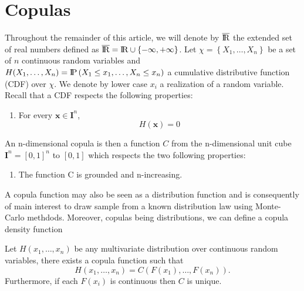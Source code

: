 \section{Copulas}

Throughout the remainder of this article, we will denote by $\overline{{\rm I\!R}}$ the extended set
of real numbers defined as $ \overline{{\rm I\!R}} = {\rm I\!R} \cup \left\{-\infty, +\infty\right\}$.
Let $\chi = \left\{ X_1, \dots, X_n\right\}$ be a set of $n$ continuous random variables and
$H(X_1, \dots, X_n) = {\rm I\!P}\left(X_1\leq x_1, \dots, X_n \leq x_n \right)$ a cumulative 
distributive function (CDF) over $\chi$. We denote by lower case $x_i$ a realization of a random
 variable. Recall that a CDF respects the following properties:
\begin{enumerate}
	\item For every $\mathbf{x} \in \mathbf{I}^n$,
	\begin{equation}
		H(\mathbf{x}) = 0 %
	\end{equation}
\end{enumerate}
An n-dimensional copula is then a function $C$ from the n-dimensional unit cube
$\mathbf{I}^n = [0, 1]^n$ to $[0, 1]$ which respects the two following properties:
\begin{enumerate}
	\item The function C is grounded and n-increasing.
\end{enumerate} 
A copula function may also be seen as a distribution function and is consequently of main interest
to draw sample from a known distribution law using Monte-Carlo methdods.
Moreover, copulas being distributions, we can define a copula density function

\begin{theorem}[Sklar 1959]
	Let $H(x_1, \dots, x_n)$ be any multivariate distribution over continuous random variables,
	there exists a copula function such that
	\begin{equation}
		H \left( x_1, \dots, x_n \right) = C \left( F(x_1), \dots, F(x_n) \right).
	\end{equation}
	Furthermore, if each $F(x_i)$ is continuous then $C$ is unique.
\end{theorem}
